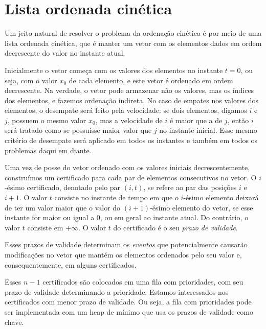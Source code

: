 


\section{Lista ordenada cinética}
\label{sec:lista}
Um jeito natural de resolver o problema da ordenação cinética é por
meio de uma lista ordenada cinética, que é manter um vetor com os
elementos dados em ordem decrescente do valor no instante atual.

Inicialmente o vetor começa com os valores dos elementos no instante
$t = 0$, ou seja, com o valor $x_0$ de cada elemento, e este vetor é
ordenado em ordem decrescente.
Na verdade, o vetor pode armazenar não os valores, mas os índices dos elementos, e fazemos
ordenação indireta.
No caso de empates nos valores dos elementos, o desempate
será feito pela velocidade: se dois elementos, digamos $i$
e $j$, possuem o mesmo valor $x_0$, mas a velocidade de $i$ é maior
que a de $j$, então $i$ será tratado como se possuísse maior valor
que $j$ no instante inicial.
Esse mesmo critério de desempate será aplicado em todos os instantes e também em todos os
problemas daqui em diante.



Uma vez de posse do vetor ordenado com os valores iniciais
decrescentemente, construímos um certificado para cada par de
elementos consecutivos no vetor.
O $i$-ésimo certificado, denotado pelo par $(i, t)$, se refere ao par das posições $i$ e $i + 1$.
O valor $t$ consiste no instante de tempo em que o $i$-ésimo elemento
deixará de ter um valor maior que o valor do $(i + 1)$-ésimo
elemento do vetor, se esse instante for maior ou igual a 0, ou em
geral ao instante atual.
Do contrário, o valor $t$ consiste em $+\infty$.
O valor $t$ do certificado é o seu \textit{prazo de
validade}.

Esses prazos de validade determinam os \textit{eventos} que
potencialmente causarão modificações no vetor que mantém os
elementos ordenados pelo seu valor e, consequentemente, em alguns
certificados.

Esses $n - 1$ certificados são colocados em uma fila com
prioridades, com seu prazo de validade determinando a prioridade.
Estamos interessados nos certificados com menor prazo de validade.
Ou seja, a fila com prioridades pode ser implementada com um heap de
mínimo que usa os prazos de validade como chave.

